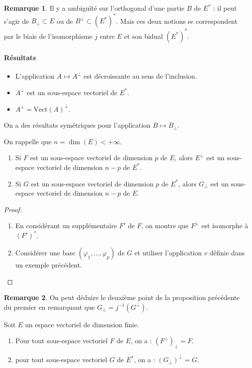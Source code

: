 \documentclass[french]{article}
\newcommand{\st}{^*}
\newcommand{\inv}{^{-1}}
\newcommand{\Vect}{\text{Vect}}
\theoremstyle{plain}
\theoremstyle{definition}
\newtheorem*{rmq}{Remarque}
\theoremstyle{remark}
\begin{document}
\begin{rmq}
	Il y a ambiguïté sur l'orthogonal d'une partie $B$ de $E\st$ : il peut s'agir de $B_\bot\subset E$ ou de $B^\bot\subset (E\st)\st$. Mais ces deux notions se correspondent par le biais de l'isomorphisme $j$ entre $E$ et son bidual $(E\st)\st$.
\end{rmq}

\paragraph{Résultats}
\begin{itemize}
	\item L'application $A\mapsto A^\bot$ est décroissante au sens de l'inclusion.
	\item $A^\bot$ est un sous-espace vectoriel de $E\st$.
	\item $A^\bot=\Vect(A)^\bot$.
\end{itemize}
On a des résultats symétriques pour l'application $B\mapsto B_\bot$.

\begin{prop}%
	On rappelle que $n=\dim(E)<+\infty$.
	\begin{enumerate}
		\item Si $F$ est un sous-espace vectoriel de dimension $p$ de $E$, alors $E^\bot$ est un sous-espace vectoriel de dimension $n-p$ de $E\st$.
		\item Si $G$ est un sous-espace vectoriel de dimension $p$ de $E\st$, alors $G_\bot$ est un sous-espace vectoriel de dimension $n-p$ de $E$.
	\end{enumerate}
\end{prop}
\begin{proof}
	\begin{enumerate}
		\item En considérant un supplémentaire $F'$ de $F$, on montre que $F^\bot$ est isomorphe à $(F')\st$.
		\item Considérer une base $(\varphi_1,\ldots,\varphi_p)$ de $G$ et utiliser l'application $v$ définie dans un exemple précédent.
	\end{enumerate}
\end{proof}

\begin{rmq}
	On peut déduire le deuxième point de la proposition précédente du premier en remarquant que $G_\bot=j\inv(G^\bot)$.
\end{rmq}

\begin{cor}%
	Soit $E$ un espace vectoriel de dimension finie.
	\begin{enumerate}
		\item Pour tout sous-espace vectoriel $F$ de $E$, on a : $(F^\bot)_\bot=F$.
		\item pour tout sous-espace vectoriel $G$ de $E\st$, on a : $(G_\bot)^\bot=G$.
	\end{enumerate}
\end{cor}
\end{document}
